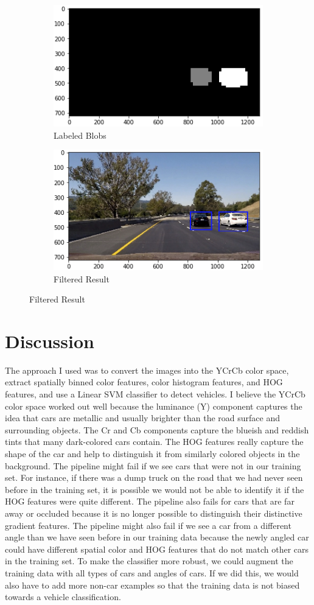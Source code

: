\documentclass[12pt]{article}
\begin{document}
\begin{figure}[!h]
\begin{subfigure}{0.495\textwidth}
\centering
\includegraphics[scale=0.6]{labels_ex1.png}
\caption{Labeled Blobs}
\end{subfigure}
\begin{subfigure}{0.495\textwidth}
\centering
\includegraphics[scale=0.6]{filtered_ex1.png}
\caption{Filtered Result}
\end{subfigure}
\end{figure}

\section{Discussion}
The approach I used was to convert the images into the YCrCb color space, extract spatially binned color features, color histogram features, and HOG features, and use a Linear SVM classifier to detect vehicles. I believe the YCrCb color space worked out well because the luminance (Y) component captures the idea that cars are metallic and usually brighter than the road surface and surrounding objects. The Cr and Cb components capture the blueish and reddish tints that many dark-colored cars contain. The HOG features really capture the shape of the car and help to distinguish it from similarly colored objects in the background. The pipeline might fail if we see cars that were not in our training set. For instance, if there was a dump truck on the road that we had never seen before in the training set, it is possible we would not be able to identify it if the HOG features were quite different. The pipeline also fails for cars that are far away or occluded because it is no longer possible to distinguish their distinctive gradient features. The pipeline might also fail if we see a car from a different angle than we have seen before in our training data because the newly angled car could have different spatial color and HOG features that do not match other cars in the training set. To make the classifier more robust, we could augment the training data with all types of cars and angles of cars. If we did this, we would also have to add more non-car examples so that the training data is not biased towards a vehicle classification.
\end{document}
